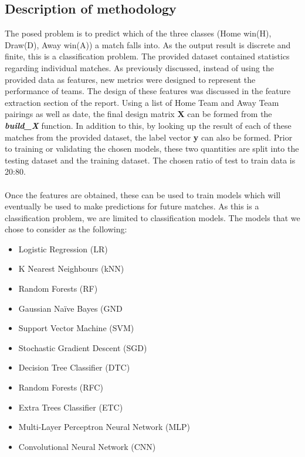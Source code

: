 \documentclass[a4paper,12pt]{article}
\begin{document}
	\subsection{Description of methodology}
	The posed problem is to predict which of the three classes (Home win(H), Draw(D), Away win(A)) a match falls into. As the output result is discrete and finite, this is a classification problem. The provided dataset contained statistics regarding individual matches. As previously discussed, instead of using the provided data as features, new metrics were designed to represent the performance of teams. The design of these features was discussed in the feature extraction section of the report. Using a list of Home Team and Away Team pairings as well as date, the final design matrix \textbf{X} can be formed from the \textbf{\textit{build\_X}} function. In addition to this, by looking up the result of each of these matches from the provided dataset, the label vector \textbf{y} can also be formed. Prior to training or validating the chosen models, these two quantities are split into the testing dataset and the training dataset. The chosen ratio of test to train data is 20:80. \\
	\\
	Once the features are obtained, these can be used to train models which will eventually be used to make predictions for future matches. As this is a classification problem, we are limited to classification models. The models that we chose to consider as the following:
	
	\begin{itemize}
		\item Logistic Regression (LR)
		\item K Nearest Neighbours (kNN)
		\item Random Forests (RF)
		\item Gaussian Naïve Bayes (GND
		\item Support Vector Machine (SVM)
		\item Stochastic Gradient Descent (SGD)
		\item Decision Tree Classifier (DTC)
		\item Random Forests (RFC)
		\item Extra Trees Classifier (ETC)
		\item Multi-Layer Perceptron Neural Network (MLP)
		\item Convolutional Neural Network (CNN)
	\end{itemize}
\end{document}
